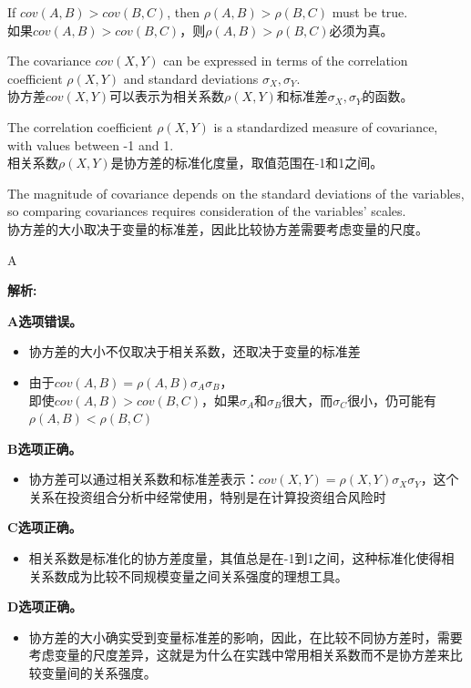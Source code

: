 \documentclass{article}
\newenvironment{explanation}
{\textbf{解析:}\par}
{\par}
\begin{document}
\begin{choices}
    \item If \(cov(A,B) > cov(B,C)\), then \(\rho(A,B) > \rho(B,C)\) must be true.\\
    如果\(cov(A,B) > cov(B,C)\)，则\(\rho(A,B) > \rho(B,C)\)必须为真。
    \item The covariance \(cov(X,Y)\) can be expressed in terms of the correlation coefficient \(\rho(X,Y)\) and standard deviations \(\sigma_X, \sigma_Y\).\\
    协方差\(cov(X,Y)\)可以表示为相关系数\(\rho(X,Y)\)和标准差\(\sigma_X, \sigma_Y\)的函数。
    \item The correlation coefficient \(\rho(X,Y)\) is a standardized measure of covariance, with values between -1 and 1.\\
    相关系数\(\rho(X,Y)\)是协方差的标准化度量，取值范围在-1和1之间。
    \item The magnitude of covariance depends on the standard deviations of the variables, so comparing covariances requires consideration of the variables' scales.\\
    协方差的大小取决于变量的标准差，因此比较协方差需要考虑变量的尺度。
\end{choices}

\begin{correctanswer}
A
\end{correctanswer}

\begin{explanation}
\textbf{A选项错误。}
\begin{itemize}
    \item 协方差的大小不仅取决于相关系数，还取决于变量的标准差
    \item 由于\(cov(A,B) = \rho(A,B)\sigma_A\sigma_B\)，\\即使\(cov(A,B) > cov(B,C)\)，如果\(\sigma_A\)和\(\sigma_B\)很大，而\(\sigma_C\)很小，仍可能有\(\rho(A,B) < \rho(B,C)\)
\end{itemize}

\textbf{B选项正确。}
\begin{itemize}
    \item 协方差可以通过相关系数和标准差表示：\(cov(X,Y) = \rho(X,Y)\sigma_X\sigma_Y\)，这个关系在投资组合分析中经常使用，特别是在计算投资组合风险时
\end{itemize}

\textbf{C选项正确。}
\begin{itemize}
    \item 相关系数是标准化的协方差度量，其值总是在-1到1之间，这种标准化使得相关系数成为比较不同规模变量之间关系强度的理想工具。
\end{itemize}

\textbf{D选项正确。}
\begin{itemize}
    \item 协方差的大小确实受到变量标准差的影响，因此，在比较不同协方差时，需要考虑变量的尺度差异，这就是为什么在实践中常用相关系数而不是协方差来比较变量间的关系强度。
\end{itemize}
\end{explanation}
\end{document}
